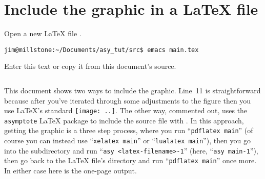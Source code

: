 \section{Include the graphic in a \LaTeX{} file}
Open a new \LaTeX{} file . 
\begin{verbatim}
jim@millstone:~/Documents/asy_tut/src$ emacs main.tex  
\end{verbatim} 
Enter this text
or copy it from this document's source.
\begin{center}
  \inputminted{TeX}{chapter1/main.tex}
\end{center} 
This document shows two ways to include the graphic.
Line~11 is straightforward because
after you've iterated through some adjustments to the figure then you   
use \LaTeX's standard \texttt{\texttt{[image: ..]}}.
The other way, commented out, 
uses the \texttt{asymptote} \LaTeX{} package
to include the \Asy{} source file with 
\texttt{}.
In this approach, getting the graphic is a three step process, where 
you run ``\texttt{pdflatex main}'' (of course
you can instead use ``\texttt{xelatex main}'' or 
``\texttt{lualatex main}''), then you go into
the  subdirectory and run 
``\texttt{asy <latex-filename>-1}''
(here, ``\texttt{asy main-1}''), then go back to the
\LaTeX{} file's directory and run ``\texttt{pdflatex main}'' once more.
In either case here is the one-page output.
\begin{center}
\end{center}


